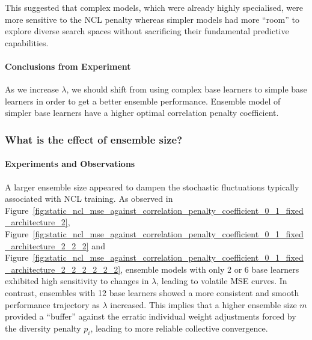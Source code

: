 \documentclass{article}
\begin{document}
This suggested that complex models, which were already highly specialised, were more sensitive to the NCL penalty whereas simpler models had more ``room'' to explore diverse search spaces without sacrificing their fundamental predictive capabilities. 

\paragraph{Conclusions from Experiment}
As we increase $\lambda$, we should shift from using complex base learners to simple base learners in order to get a better ensemble performance. Ensemble model of simpler base learners have a higher optimal correlation penalty coefficient. 


\subsubsection{What is the effect of ensemble size?}
\paragraph{Experiments and Observations}
A larger ensemble size appeared to dampen the stochastic fluctuations typically associated with NCL training. As observed in Figure~\ref{fig:static_ncl_mse_against_correlation_penalty_coefficient_0_1_fixed_architecture_2}, Figure~\ref{fig:static_ncl_mse_against_correlation_penalty_coefficient_0_1_fixed_architecture_2_2_2} and Figure~\ref{fig:static_ncl_mse_against_correlation_penalty_coefficient_0_1_fixed_architecture_2_2_2_2_2_2}, ensemble models with only 2 or 6 base learners exhibited high sensitivity to changes in $\lambda$, leading to volatile MSE curves. In contrast, ensembles with 12 base learners showed a more consistent and smooth performance trajectory as $\lambda$ increased. This implies that a higher ensemble size $m$ provided a ``buffer'' against the erratic individual weight adjustments forced by the diversity penalty $p_i$, leading to more reliable collective convergence. 
\end{document}
